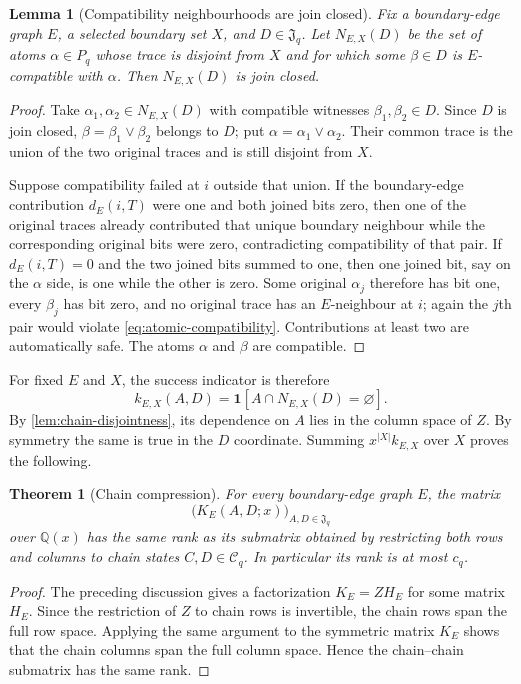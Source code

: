 \documentclass[11pt,reqno]{amsart}
\newtheorem{theorem}{Theorem}[section]
\newtheorem{lemma}[lemma]{Lemma}
\theoremstyle{definition}
\begin{document}
\begin{lemma}[Compatibility neighbourhoods are join closed]
\label{lem:compatibility-neighborhood}
Fix a boundary-edge graph $E$, a selected boundary set $X$, and
$D\in\mathfrak J_q$.  Let $N_{E,X}(D)$ be the set of atoms $\alpha\in P_q$
whose trace is disjoint from $X$ and for which some $\beta\in D$ is
$E$-compatible with $\alpha$.  Then $N_{E,X}(D)$ is join closed.
\end{lemma}

\begin{proof}
Take $\alpha_1,\alpha_2\in N_{E,X}(D)$ with compatible witnesses
$\beta_1,\beta_2\in D$.  Since $D$ is join closed,
$\beta=\beta_1\vee\beta_2$ belongs to $D$; put
$\alpha=\alpha_1\vee\alpha_2$.  Their common trace is the union of the two
original traces and is still disjoint from $X$.

Suppose compatibility failed at $i$ outside that union.  If the boundary-edge
contribution $d_E(i,T)$ were one and both joined bits zero, then one of the
original traces already contributed that unique boundary neighbour while the
corresponding original bits were zero, contradicting compatibility of that
pair.  If $d_E(i,T)=0$ and the two joined bits summed to one, then one joined
bit, say on the $\alpha$ side, is one while the other is zero.  Some original
$\alpha_j$ therefore has bit one, every $\beta_j$ has bit zero, and no original
trace has an $E$-neighbour at $i$; again the $j$th pair would violate
\eqref{eq:atomic-compatibility}.  Contributions at least two are automatically
safe.  The atoms $\alpha$ and $\beta$ are compatible.
\end{proof}

For fixed $E$ and $X$, the success indicator is therefore
\[
 k_{E,X}(A,D)
 =\mathbf1[A\cap N_{E,X}(D)=\varnothing].
\]
By \cref{lem:chain-disjointness}, its dependence on $A$ lies in the column
space of $Z$.  By symmetry the same is true in the $D$ coordinate.  Summing
$x^{|X|}k_{E,X}$ over $X$ proves the following.

\begin{theorem}[Chain compression]\label{thm:chain-compression}
For every boundary-edge graph $E$, the matrix
\[
 \bigl(K_E(A,D;x)\bigr)_{A,D\in\mathfrak J_q}
\]
over $\mathbb Q(x)$ has the same rank as its submatrix obtained by restricting
both rows and columns to chain states $C,D\in\mathcal C_q$.  In particular its
rank is at most $c_q$.
\end{theorem}

\begin{proof}
The preceding discussion gives a factorization $K_E=ZH_E$ for some matrix
$H_E$.  Since the restriction of $Z$ to chain rows is invertible, the chain
rows span the full row space.  Applying the same argument to the symmetric
matrix $K_E$ shows that the chain columns span the full column space.  Hence
the chain--chain submatrix has the same rank.
\end{proof}
\end{document}
